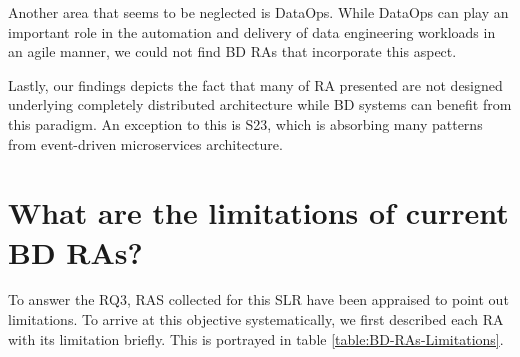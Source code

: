 \documentclass[review]{elsarticle}
\begin{document}
Another area that seems to be neglected is DataOps. While DataOps can play an important role in the automation and delivery of data engineering workloads in an agile manner, we could not find BD RAs that incorporate this aspect.

Lastly, our findings depicts the fact that many of RA presented are not designed underlying completely distributed architecture while BD systems can benefit from this paradigm. An exception to this is S23, which is absorbing many patterns from event-driven microservices architecture.

\section{What are the limitations of current BD RAs?}

To answer the RQ3, RAS collected for this SLR have been appraised to point out limitations. To arrive at this objective systematically, we first described each RA with its limitation briefly. This is portrayed in table \ref{table:BD-RAs-Limitations}.
\end{document}
